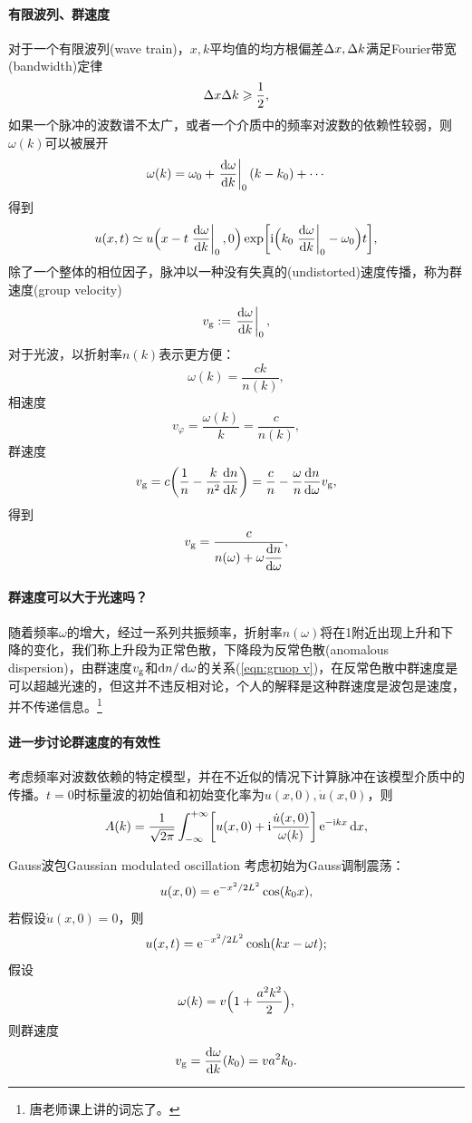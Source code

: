 \paragraph{有限波列、群速度}
对于一个有限波列(wave train)，$x,k$平均值的均方根偏差$\Delta x,\Delta k$满足Fourier带宽(bandwidth)定律
\begin{equation}
    \Delta x\Delta k\geqslant\frac12,
\end{equation}
如果一个脉冲的波数谱不太广，或者一个介质中的频率对波数的依赖性较弱，则$\omega(k)$可以被展开
\[
    \omega(k)=\omega_0+\left.\frac{\mathrm{d}^{\;\!\!}\omega}{\mathrm{d} k^{\;\!\!}}\right\rvert_0(k-k_0)+\cdots
\]
得到 
\[
    u(x,t)\simeq u\Bigkh{x-t\edg{\dv\omega k}_0,0}\exp\biggfkh{\i\Bigkh{k_0\edg{\dv\omega k}_0-\omega_0}t},
\]
除了一个整体的相位因子，脉冲以一种没有失真的(undistorted)速度传播，称为群速度(group velocity)
\begin{equation}
    v_\text g:=\left.\frac{\mathrm{d}^{\;\!\!}\omega}{\mathrm{d} k^{\;\!\!}}\right\rvert_0,
\end{equation}
对于光波，以折射率$n(k)$表示更方便：
\[
    \omega(k)=\frac{ck}{n(k)},
\]
相速度
\[
    v_\varphi=\frac{\omega(k)}k=\frac c{n(k)},
\]
群速度
\[
    v_\text g=c\biggkh{\frac1n-\frac k{n^2}\dv nk}=\frac cn-\frac\omega n\dv n\omega v_\text g,
\]
得到 
\begin{equation}
    \label{eqn:gruop v}
    v_\text g=\frac c{\displaystyle n(\omega)+\omega\frac{\mathrm{d}^{\;\!\!}n}{\mathrm{d} \omega^{\;\!\!}}},
\end{equation}
\paragraph{群速度可以大于光速吗？}
随着频率$\omega$的增大，经过一系列共振频率，折射率$n(\omega)$将在1附近出现上升和下降的变化，我们称上升段为正常色散，下降段为反常色散(anomalous dispersion)，由群速度$v_\text g$和$\mathop{}\!\mathrm{d} n/\mathop{}\!\mathrm{d}\omega$的关系(\ref{eqn:gruop v})，在反常色散中群速度是可以超越光速的，但这并不违反相对论，个人的解释是这种群速度是波包是速度，并不传递信息。\footnote{唐老师课上讲的词忘了。}
\paragraph{进一步讨论群速度的有效性}
考虑频率对波数依赖的特定模型，并在不近似的情况下计算脉冲在该模型介质中的传播。$t=0$时标量波的初始值和初始变化率为$u(x,0),\dot u(x,0)$，则 
\[
    A(k)=\frac1{\sqrt{2\pi}}\int_{-\infty}^{+\infty}\biggl[u(x,0)+\mathrm{i}\frac{\dot u(x,0)}{\omega(k)}\biggr]\mathop{}\!\mathrm{e}^{-\mathrm{i} kx}\mathop{}\!\mathrm{d} x,
\]
\begin{example}{Gauss波包}{Gaussian modulated oscillation}
    考虑初始为Gauss调制震荡：
    \[
        u(x,0)=\mathop{}\!\mathrm{e}^{-x^2/2L^2}\cos(k_0x),
    \]
    若假设$\dot u(x,0)=0$，则
    \[
        u(x,t)=\mathop{}\!\mathrm{e}^{-x^2/2L^2}\cosh(kx-\omega t);
    \]
    \tcblower
    假设 
    \[
        \omega(k)=v\Bigl(1+\frac{a^2k^2}2\Bigr),
    \]
    则群速度
    \[
        v_\text g=\frac{\mathrm{d}^{\;\!\!}\omega}{\mathrm{d} k^{\;\!\!}}(k_0)=va^2k_0.
    \]
\end{example}
